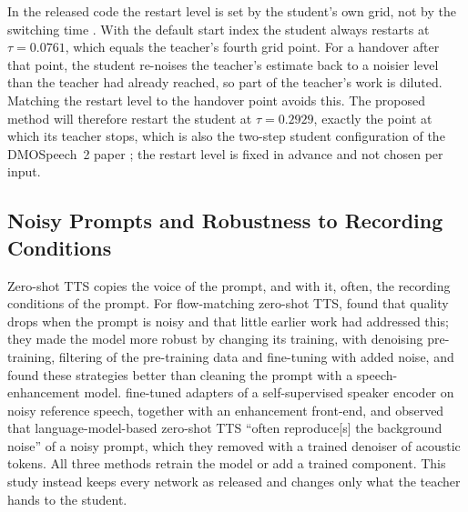 In the released code the restart level is set by the student's own grid, not by the switching time \parencite{li2025dmospeech2code}. With the default start index the student always restarts at $\tau=0.0761$, which equals the teacher's fourth grid point. For a handover after that point, the student re-noises the teacher's estimate back to a noisier level than the teacher had already reached, so part of the teacher's work is diluted. Matching the restart level to the handover point avoids this. The proposed method will therefore restart the student at $\tau=0.2929$, exactly the point at which its teacher stops, which is also the two-step student configuration of the DMOSpeech~2 paper \parencite{li2025dmospeech2}; the restart level is fixed in advance and not chosen per input.

\subsection{Noisy Prompts and Robustness to Recording Conditions}
\label{sec:rrl-noise}

Zero-shot TTS copies the voice of the prompt, and with it, often, the recording conditions of the prompt. For flow-matching zero-shot TTS, \textcite{wang2024noise} found that quality drops when the prompt is noisy and that little earlier work had addressed this; they made the model more robust by changing its training, with denoising pre-training, filtering of the pre-training data and fine-tuning with added noise, and found these strategies better than cleaning the prompt with a speech-enhancement model. \textcite{fujita2024noiserobust} fine-tuned adapters of a self-supervised speaker encoder on noisy reference speech, together with an enhancement front-end, and \textcite{lu2025noise} observed that language-model-based zero-shot TTS \enquote{often reproduce[s] the background noise} of a noisy prompt, which they removed with a trained denoiser of acoustic tokens. All three methods retrain the model or add a trained component. This study instead keeps every network as released and changes only what the teacher hands to the student.

